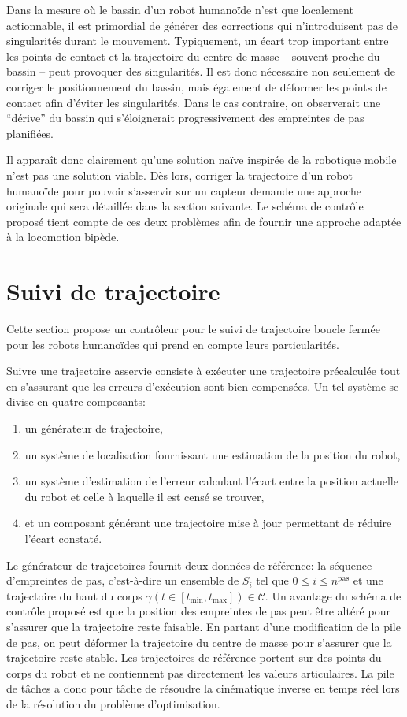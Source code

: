 Dans la mesure où le bassin d'un robot humanoïde n'est que localement
actionnable, il est primordial de générer des corrections qui
n'introduisent pas de singularités durant le mouvement. Typiquement,
un écart trop important entre les points de contact et la trajectoire
du centre de masse -- souvent proche du bassin -- peut provoquer des
singularités. Il est donc nécessaire non seulement de corriger le
positionnement du bassin, mais également de déformer les points de
contact afin d'éviter les singularités. Dans le cas contraire, on
observerait une ``dérive'' du bassin qui s'éloignerait progressivement
des empreintes de pas planifiées.

Il apparaît donc clairement qu'une solution naïve inspirée de la
robotique mobile n'est pas une solution viable. Dès lors, corriger la
trajectoire d'un robot humanoïde pour pouvoir s'asservir sur un
capteur demande une approche originale qui sera détaillée dans la
section suivante. Le schéma de contrôle proposé tient compte de ces
deux problèmes afin de fournir une approche adaptée à la locomotion
bipède.

\section{Suivi de trajectoire}\label{closedloop}


Cette section propose un contrôleur pour le suivi de trajectoire
boucle fermée pour les robots humanoïdes qui prend en compte leurs
particularités.

Suivre une trajectoire asservie consiste à exécuter une trajectoire
précalculée tout en s'assurant que les erreurs d'exécution sont bien
compensées. Un tel système se divise en quatre composants:

\begin{enumerate}
\item un générateur de trajectoire,
\item un système de localisation fournissant une estimation de la position du robot,
\item un système d'estimation de l'erreur calculant l'écart entre la
  position actuelle du robot et celle à laquelle il est censé se
  trouver,
\item et un composant générant une trajectoire mise à jour permettant
  de réduire l'écart constaté.
\end{enumerate}


Le générateur de trajectoires fournit deux données de référence: la
séquence d'empreintes de pas, c'est-à-dire un ensemble de $S_i$ tel
que \mbox{$0 \leq i \leq n^{\text{pas}}$} et une trajectoire du haut
du corps \mbox{$\gamma(t \in [t_{\text{min}}, t_{\text{max}}]) \in
  \mathcal{C}$}. Un avantage du schéma de contrôle proposé est que la
position des empreintes de pas peut être altéré pour s'assurer que la
trajectoire reste faisable. En partant d'une modification de la pile
de pas, on peut déformer la trajectoire du centre de masse pour
s'assurer que la trajectoire reste stable. Les trajectoires de
référence portent sur des points du corps du robot et ne contiennent
pas directement les valeurs articulaires. La pile de tâches a donc pour
tâche de résoudre la cinématique inverse en temps réel lors de la
résolution du problème d'optimisation.

